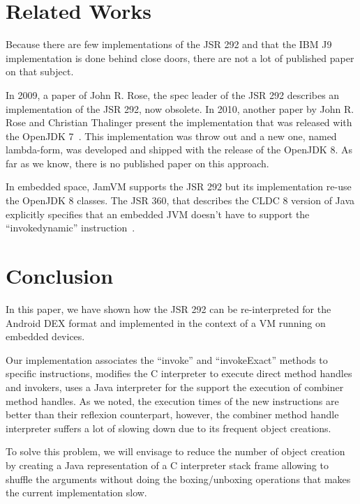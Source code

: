 \documentclass{sig-alternate}
\def \Jsr{JSR\xspace}
\def \JSR{\Jsr 292\xspace}
\begin{document}
\section{Related Works}
  Because there are few implementations of the \JSR and that the IBM J9 implementation is done behind close doors,
  there are not a lot of published paper on that subject.

  In 2009, a paper of John R. Rose, the spec leader of the \JSR describes an implementation of the \JSR,
  now obsolete\cite{vmil-rose-indy-2009}. In 2010, another paper by John R. Rose and Christian Thalinger present the implementation
  that was released with the OpenJDK 7~\cite{pppj-rose-indy-2010}. This implementation was throw out and a new one, named lambda-form,
  was developed and shipped with the release of the OpenJDK 8. As far as we know, there is no published paper on this approach.

  In embedded space, JamVM supports the \JSR but its implementation re-use the OpenJDK 8 classes.
  The \Jsr 360, that describes the CLDC 8 version of Java explicitly specifies that an embedded JVM doesn't have to support the  ``invokedynamic'' instruction~\cite{jcp-jsr-360}.
  
\section{Conclusion}
  In this paper, we have shown how the \JSR can be re-interpreted for the Android DEX format and
  implemented in the context of a VM running on embedded devices.

  Our implementation associates the ``invoke'' and ``invokeExact'' methods to specific instructions,
  modifies the C interpreter to execute direct method handles and invokers, uses a Java interpreter for the support
  the execution of combiner method handles. 
  As we noted, the execution times of the new instructions are better than their reflexion counterpart,
  however, the combiner method handle interpreter suffers a lot of slowing down due to its frequent object creations.

  To solve this problem, we will envisage to reduce the number of object creation by creating a Java representation of
  a C interpreter stack frame allowing to shuffle the arguments without doing the boxing/unboxing operations that
  makes the current implementation slow.

\appendix

\end{document}
